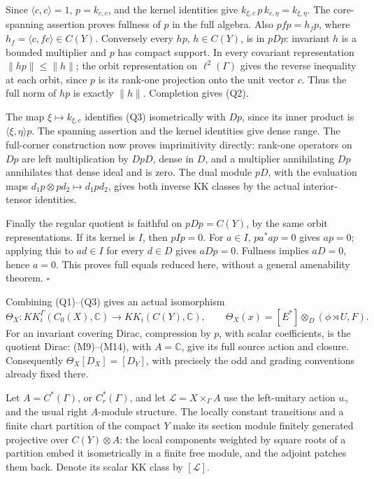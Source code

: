 \documentclass[
  11pt,
]{article}
\begin{document}
Since \(\langle c,c\rangle=1\), \(p=k_{c,c}\), and the kernel identities
give \(k_{\xi,c}\,p\,k_{c,\eta}=k_{\xi,\eta}\). The core-spanning
assertion proves fullness of \(p\) in the full algebra. Also
\(p f p=h_fp\), where \(h_f=\langle c,fc\rangle\in C(Y)\). Conversely
every \(hp\), \(h\in C(Y)\), is in \(pDp\): invariant \(h\) is a bounded
multiplier and \(p\) has compact support. In every covariant
representation \(\|hp\|\leq\|h\|\); the orbit representation on
\(\ell^2(\Gamma)\) gives the reverse inequality at each orbit, since
\(p\) is its rank-one projection onto the unit vector \(c\). Thus the
full norm of \(hp\) is exactly \(\|h\|\). Completion gives (Q2).

The map \(\xi\mapsto k_{\xi,c}\) identifies (Q3) isometrically with
\(Dp\), since its inner product is \(\langle\xi,\eta\rangle p\). The
spanning assertion and the kernel identities give dense range. The
full-corner construction now proves imprimitivity directly: rank-one
operators on \(Dp\) are left multiplication by \(DpD\), dense in \(D\),
and a multiplier annihilating \(Dp\) annihilates that dense ideal and is
zero. The dual module \(pD\), with the evaluation maps
\(d_1p\otimes pd_2\mapsto d_1pd_2\), gives both inverse KK classes by
the actual interior-tensor identities.

Finally the regular quotient is faithful on \(pDp=C(Y)\), by the same
orbit representations. If its kernel is \(I\), then \(pIp=0\). For
\(a\in I\), \(pa^*ap=0\) gives \(ap=0\); applying this to \(ad\in I\)
for every \(d\in D\) gives \(aDp=0\). Fullness implies \(aD=0\), hence
\(a=0\). This proves full equals reduced here, without a general
amenability theorem. \(\square\)

Combining (Q1)--(Q3) gives an actual isomorphism \[
 \Theta_X:KK_i^\Gamma(C_0(X),\mathbb C)
              \longrightarrow KK_i(C(Y),\mathbb C),\qquad
 \Theta_X(x)=[E^*]\otimes_D(\phi\rtimes U,F).
 \tag{Q5}
\] For an invariant covering Dirac, compression by \(p\), with scalar
coefficients, is the quotient Dirac: (M9)--(M14), with \(A=\mathbb C\),
give its full source action and closure. Consequently
\(\Theta_X[D_X]=[D_Y]\), with precisely the odd and grading conventions
already fixed there.

Let \(A=C^*(\Gamma)\), or \(C_r^*(\Gamma)\), and let
\(\mathcal L=X\times_\Gamma A\) use the left-unitary action \(u_\gamma\)
and the usual right \(A\)-module structure. The locally constant
transitions and a finite chart partition of the compact \(Y\) make its
section module finitely generated projective over \(C(Y)\otimes A\): the
local components weighted by square roots of a partition embed it
isometrically in a finite free module, and the adjoint patches them
back. Denote its scalar KK class by \([\mathcal L]\).
\end{document}
